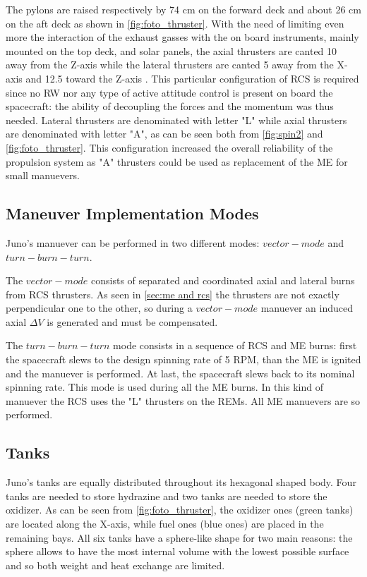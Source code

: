 
The pylons are raised respectively by 74 cm on the forward deck and about 26 cm on the aft deck as shown in \autoref{fig:foto_thruster}. With the need of limiting even more the interaction of the exhaust gasses with the on board instruments, mainly mounted on the top deck, and solar panels, the axial thrusters are canted 10\textdegree \; away from the Z-axis while the lateral thrusters are canted 5\textdegree \; away from the X-axis and 12.5\textdegree \; toward the Z-axis \cite{junno_inner}. This particular configuration of RCS is required since no RW nor any type of active attitude control is present on board the spacecraft: the ability of decoupling the forces and the momentum was thus needed.
Lateral thrusters are denominated with letter "L" while axial thrusters are denominated with letter "A", as can be seen both from \autoref{fig:spin2} and \autoref{fig:foto_thruster}. This configuration increased the overall reliability of the propulsion system as "A" thrusters could be used as replacement of the ME for small manuevers. 

\subsection{Maneuver Implementation Modes}
\label{sec: manuever implemementation modes}

Juno's manuever can be performed in two different modes: $vector-mode$ and $turn-burn-turn$. 

The $vector-mode$ consists of separated and coordinated axial and lateral burns from RCS thrusters. As seen in \autoref{sec:me and rcs} the thrusters are not exactly perpendicular one to the other, so during a $vector-mode$ manuever an induced axial $\Delta V$ is generated and must be compensated.


The $turn-burn-turn$ mode consists in a sequence of RCS and ME burns: first the spacecraft slews to the design spinning rate of 5 RPM, than the ME is ignited and the manuever is performed. At last, the spacecraft slews back to its nominal spinning rate. This mode is used during all the ME burns. In this kind of manuever the RCS uses the "L" thrusters on the REMs. All ME manuevers are so performed. 

\subsection{Tanks} 
\label{sec: tanks}
Juno's tanks are equally distributed throughout its hexagonal shaped body. Four tanks are needed to store hydrazine and two tanks are needed to store the oxidizer. As can be seen from \autoref{fig:foto_thruster}, the oxidizer ones (green tanks) are located along the X-axis, while fuel ones (blue ones) are placed in the remaining bays. All six tanks have a sphere-like shape for two main reasons: the sphere allows to have the most internal volume with the lowest possible surface and so both weight and heat exchange are limited.


